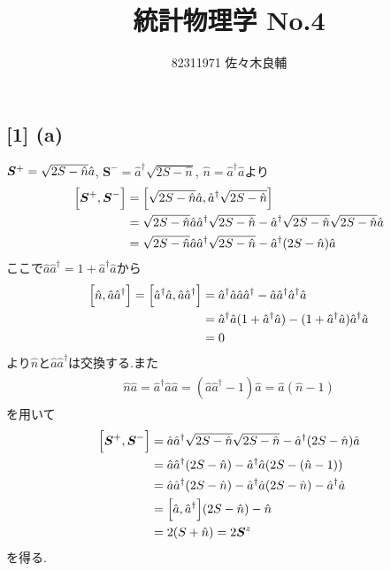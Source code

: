 \documentclass[uplatex,a4j,11pt,dvipdfmx]{jsarticle}
\begin{document}
\title{統計物理学 No.4}
\author{82311971 佐々木良輔}
\date{}
\maketitle
\subsection*{[1] (a)}
${\bm S}^+=\sqrt{2S-\Hat{n}}\hat{a}$, ${\bm S}^-=\hat{a}^\dagger\sqrt{2S-\hat{n}}$, $\hat{n}=\hat{a}^\dagger\hat{a}$より
\begin{align}
  \begin{split}
    \Bigl[{\bm S}^+,{\bm S}^-\Bigr]&=\Bigl[\sqrt{2S-\Hat{n}}\hat{a},\hat{a}^\dagger\sqrt{2S-\hat{n}}\Bigr]\\
    &=\sqrt{2S-\Hat{n}}\hat{a}\hat{a}^\dagger\sqrt{2S-\hat{n}}-\hat{a}^\dagger\sqrt{2S-\hat{n}}\sqrt{2S-\Hat{n}}\hat{a}\\
    &=\sqrt{2S-\Hat{n}}\hat{a}\hat{a}^\dagger\sqrt{2S-\hat{n}}-\hat{a}^\dagger(2S-\Hat{n})\hat{a}
  \end{split}
\end{align}
ここで$\hat{a}\hat{a}^\dagger=1+\hat{a}^\dagger\hat{a}$から
\begin{align}
  \begin{split}
    \Bigl[\hat{n},\hat{a}\hat{a}^\dagger\Bigr]=\Bigl[\hat{a}^\dagger\hat{a},\hat{a}\hat{a}^\dagger\Bigr]&=\hat{a}^\dagger\hat{a}\hat{a}\hat{a}^\dagger-\hat{a}\hat{a}^\dagger\hat{a}^\dagger\hat{a}\\
    &=\hat{a}^\dagger\hat{a}(1+\hat{a}^\dagger\hat{a})-(1+\hat{a}^\dagger\hat{a})\hat{a}^\dagger\hat{a}\\
    &=0
  \end{split}
\end{align}
より$\hat{n}$と$\hat{a}\hat{a}^\dagger$は交換する.また
\begin{align}
  \begin{split}
    \hat{n}\hat{a}=\hat{a}^\dagger\hat{a}\hat{a}=(\hat{a}\hat{a}^\dagger-1)\hat{a}=\hat{a}(\hat{n}-1)
  \end{split}
\end{align}
を用いて
\begin{align}
  \begin{split}
    \Bigl[{\bm S}^+,{\bm S}^-\Bigr]
    &=\hat{a}\hat{a}^\dagger\sqrt{2S-\Hat{n}}\sqrt{2S-\hat{n}}-\hat{a}^\dagger(2S-\Hat{n})\hat{a}\\
    &=\hat{a}\hat{a}^\dagger(2S-\hat{n})-\hat{a}^\dagger\hat{a}(2S-(\Hat{n}-1))\\
    &=\hat{a}\hat{a}^\dagger(2S-\hat{n})-\hat{a}^\dagger\hat{a}(2S-\Hat{n})-\hat{a}^\dagger\hat{a}\\
    &=\Bigl[\hat{a},\hat{a}^\dagger\Bigr](2S-\hat{n})-\hat{n}\\
    &=2(S+\hat{n})=2{\bm S}^z
  \end{split}
\end{align}
を得る.
\end{document}
